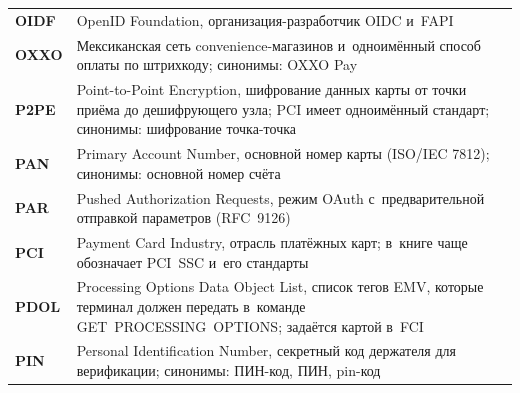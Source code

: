 \begin{longtable}{@{}p{4.5em}p{\dimexpr\linewidth-4.5em-2\tabcolsep\relax}@{}}
  \textbf{OIDF}              & OpenID Foundation, организация-разработчик OIDC и~FAPI                                                                                                                                                                                                                                           \\
  \textbf{OXXO}              & Мексиканская сеть convenience-магазинов и~одноимённый способ оплаты по штрихкоду; синонимы: OXXO Pay                                                                                                                                                                                             \\
  \textbf{P2PE}              & Point-to-Point Encryption, шифрование данных карты от точки приёма до дешифрующего узла; PCI имеет одноимённый стандарт; синонимы: шифрование точка-точка                                                                                                                                        \\
  \textbf{PAN}               & Primary Account Number, основной номер карты (ISO/IEC 7812); синонимы: основной номер счёта                                                                                                                                                                                                       \\
  \textbf{PAR}               & Pushed Authorization Requests, режим OAuth с~предварительной отправкой параметров (RFC~9126)                                                                                                                                                                                                     \\
  \textbf{PCI}               & Payment Card Industry, отрасль платёжных карт; в~книге чаще обозначает PCI~SSC и~его стандарты                                                                                                                                                                                                          \\
  \textbf{PDOL}              & Processing Options Data Object List, список тегов EMV, которые терминал должен передать в~команде GET~PROCESSING~OPTIONS; задаётся картой в~FCI                                                                                                                                                 \\
  \textbf{PIN}               & Personal Identification Number, секретный код держателя для верификации; синонимы: ПИН-код, ПИН, pin-код                                                                                                                                                                                         \\

\end{longtable}
